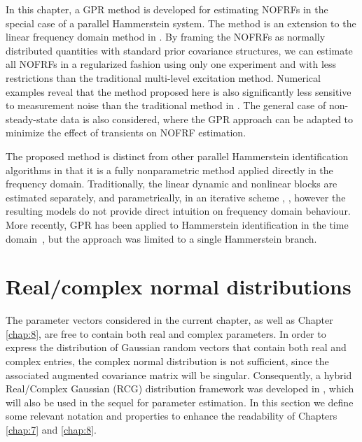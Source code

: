 In this chapter, a GPR method is developed for estimating NOFRFs in the special case of a parallel Hammerstein system. The method is an extension to the linear frequency domain method in \cite{Lataire2016}. By framing the NOFRFs as normally distributed quantities with standard prior covariance structures, we can estimate all NOFRFs in a regularized fashion using only one experiment and with less restrictions than the traditional multi-level excitation method. Numerical examples reveal that the method proposed here is also significantly less sensitive to measurement noise than the traditional method in \cite{Lang2005}. The general case of non-steady-state data is also considered, where the GPR approach can be adapted to minimize the effect of transients on NOFRF estimation. 

The proposed method is distinct from other parallel Hammerstein identification algorithms in that it is a fully nonparametric method applied directly in the frequency domain. Traditionally, the linear dynamic and nonlinear blocks are estimated separately, and parametrically, in an iterative scheme \cite{Gallman1975}, \cite{Schoukens2011}, however the resulting models do not provide direct intuition on frequency domain behaviour. More recently, GPR has been applied to Hammerstein identification in the time domain~\cite{Risuleo2017}, but the approach was limited to a single Hammerstein branch.

\section{Real/complex normal distributions}
\label{sec:RCN}

The parameter vectors considered in the current chapter, as well as Chapter \ref{chap:8}, are free to contain both real and complex parameters. In order to express the distribution of Gaussian random vectors that contain both real and complex entries, the complex normal distribution \cite{Schreier2010} is not sufficient, since the associated augmented covariance matrix will be singular. Consequently, a hybrid Real/Complex Gaussian (RCG) distribution framework was developed in \cite{Lataire2016}, which will also be used in the sequel for parameter estimation. In this section we define some relevant notation and properties to enhance the readability of Chapters \ref{chap:7} and \ref{chap:8}. 

